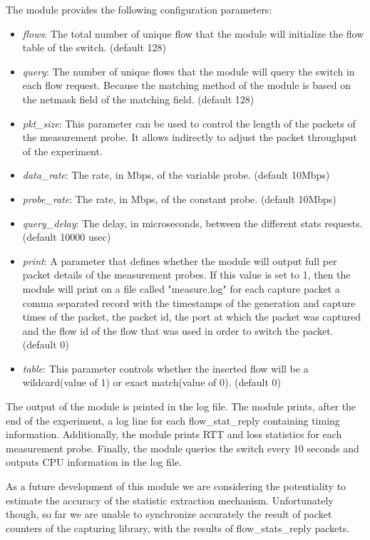 \documentclass{book}
\begin{document}
The module provides the following configuration parameters:
\begin{itemize}
    \item \emph{flows}: The total number of unique flow that the module will
        initialize the flow table of the switch. (default 128)
    \item \emph{query}: The number of unique flows that the module will query the 
        switch in each flow request. Because the matching method of the module is based 
        on the netmask field of the matching field. (default 128)
    \item \emph{pkt\_size}:  This parameter can be used to control the length of the
        packets of the measurement probe. It allows indirectly to adjust the packet
        throughput of the experiment.
    \item \emph{data\_rate}: The rate, in Mbps, of the variable probe. (default
        10Mbps)
    \item \emph{probe\_rate}: The rate, in Mbps, of the constant probe. (default 10Mbps)
    \item \emph{query\_delay}: The delay, in microseconds, between the different 
        stats requests. (default 10000 usec) 
    \item \emph{print}: A parameter that defines whether the module will output full
        per packet details of the measurement probes. If this value is set to 1, then
        the module will print on a file called "measure.log" for each capture packet a
        comma separated record with the timestamps of the generation and capture times of the
        packet, the packet id, the port at which the packet was captured and the flow id 
        of the flow that was used in order to switch the packet. (default 0)
    \item \emph{table}: This parameter controls whether the inserted flow will be
        a wildcard(value of 1) or exact match(value of 0). (default 0)
\end{itemize}

The output of the module is printed in the log file. The module prints, after the
end of the experiment, a log line for each flow\_stat\_reply containing timing
information. Additionally, the module prints RTT and loss statistics for each
measurement probe. Finally, the module queries the switch every 10 seconds and
outputs CPU information in the log file. 

As a future development of this module we are considering the potentiality to
estimate the accuracy of the statistic extraction mechanism. Unfortunately
though, so far we are unable to synchronize accurately the result of packet
counters of the capturing library, with the results of flow\_stats\_reply 
packets. 
\end{document}
